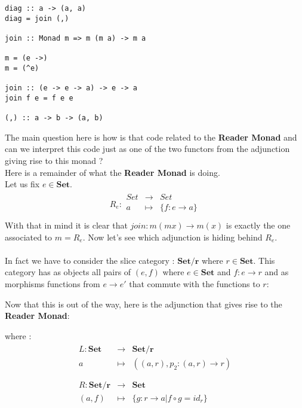 \documentclass[a4paper,12pt]{article}
\begin{document}
\begin{verbatim}
diag :: a -> (a, a)
diag = join (,)

join :: Monad m => m (m a) -> m a

m = (e ->)
m = (^e)

join :: (e -> e -> a) -> e -> a
join f e = f e e

(,) :: a -> b -> (a, b)
\end{verbatim}
The main question here is how is that code related to the \textbf{Reader Monad} and can we interpret this code just as one of the two functors from the adjunction giving rise to this monad ?\\
Here is a remainder of what the \textbf{Reader Monad} is doing.\\
Let us fix $e \in \textbf{Set}$.
\begin{equation*}
\begin{split}
R_e:
\begin{array}{ccc}
Set & \to & Set\\
a & \mapsto & \{f: e \to a \}\\
\end{array}
\end{split}
\end{equation*}
With that in mind it is clear that $join: m(m x) \to m(x)$ is exactly the one associated to $m=R_e$. Now let's see which adjunction is hiding behind $R_e$.\\
\\
In fact we have to consider the slice category : $\textbf{Set/r}$ where $r \in \textbf{Set}$. This category has as objects all pairs of $(e,f)$ where $e \in \textbf{Set}$ and $f:e \to r$ and as morphisms functions from $e \to e'$ that commute with the functions to $r$:
\begin{center}
\end{center}
Now that this is out of the way, here is the adjunction that gives rise to the \textbf{Reader Monad}:
\begin{center}
\end{center}
where :
\begin{equation*}
\begin{split}
\begin{array}{ccc}
L:
\textbf{Set}  & \to & \textbf{Set/r} \\
a & \mapsto & ((a,r),p_2:(a,r) \to r)\\
\\
\\
R:
\textbf{Set/r}  & \to & \textbf{Set} \\
(a,f) & \mapsto & \{g:r \to a | f \circ g=id_r\}\\
\end{array}
\end{split}
\end{equation*}
\end{document}
